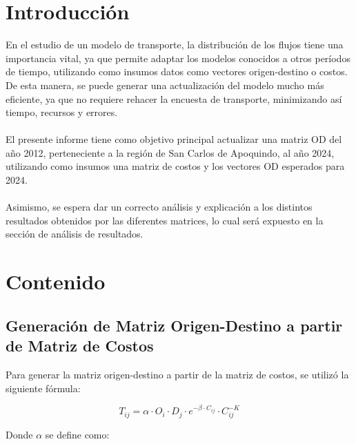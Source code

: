 \documentclass[12pt]{article} %
\begin{document}

\setcounter{page}{1}
\section{Introducción}

En el estudio de un modelo de transporte, la distribución de los flujos tiene una importancia vital, ya que permite adaptar los modelos conocidos a otros períodos de tiempo, utilizando como insumos datos como vectores origen-destino o costos. De esta manera, se puede generar una actualización del modelo mucho más eficiente, ya que no requiere rehacer la encuesta de transporte, minimizando así tiempo, recursos y errores.
\\ \\
El presente informe tiene como objetivo principal actualizar una matriz OD del año 2012, perteneciente a la región de San Carlos de Apoquindo, al año 2024, utilizando como insumos una matriz de costos y los vectores OD esperados para 2024.
\\ \\
Asimismo, se espera dar un correcto análisis y explicación a los distintos resultados obtenidos por las diferentes matrices, lo cual será expuesto en la sección de análisis de resultados.

\section{Contenido}
\subsection{Generación de Matriz Origen-Destino a partir de Matriz de Costos}

Para generar la matriz origen-destino a partir de la matriz de costos, se utilizó la siguiente fórmula:

\begin{equation}
  T_{ij} = \alpha \cdot O_i \cdot D_j \cdot e^{-\beta \cdot C_{ij}} \cdot C_{ij}^{-K}
\end{equation}

Donde \(\alpha\) se define como:
\end{document}
